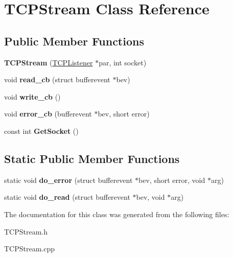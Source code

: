 \hypertarget{class_t_c_p_stream}{}\section{T\+C\+P\+Stream Class Reference}
\label{class_t_c_p_stream}
\subsection*{Public Member Functions}
\begin{DoxyCompactItemize}
\item 
\hypertarget{class_t_c_p_stream_ae126e2a8af6d194637373e76a1806b18}{}{\bfseries T\+C\+P\+Stream} (\hyperlink{class_t_c_p_listener}{T\+C\+P\+Listener} $\ast$par, int socket)\label{class_t_c_p_stream_ae126e2a8af6d194637373e76a1806b18}

\item 
\hypertarget{class_t_c_p_stream_a32945f003973524a10ea18bbaf14a075}{}void {\bfseries read\+\_\+cb} (struct bufferevent $\ast$bev)\label{class_t_c_p_stream_a32945f003973524a10ea18bbaf14a075}

\item 
\hypertarget{class_t_c_p_stream_a557fe31c23096914a4911fa3ebcb2f29}{}void {\bfseries write\+\_\+cb} ()\label{class_t_c_p_stream_a557fe31c23096914a4911fa3ebcb2f29}

\item 
\hypertarget{class_t_c_p_stream_a8dea29fae2a788badb0e478e332ac5a7}{}void {\bfseries error\+\_\+cb} (bufferevent $\ast$bev, short error)\label{class_t_c_p_stream_a8dea29fae2a788badb0e478e332ac5a7}

\item 
\hypertarget{class_t_c_p_stream_aaf98bda8c2e4e300dea89f8270ac8b25}{}const int {\bfseries Get\+Socket} ()\label{class_t_c_p_stream_aaf98bda8c2e4e300dea89f8270ac8b25}

\end{DoxyCompactItemize}
\subsection*{Static Public Member Functions}
\begin{DoxyCompactItemize}
\item 
\hypertarget{class_t_c_p_stream_a862545460538d4cb7d61e4e7c9b9a41c}{}static void {\bfseries do\+\_\+error} (struct bufferevent $\ast$bev, short error, void $\ast$arg)\label{class_t_c_p_stream_a862545460538d4cb7d61e4e7c9b9a41c}

\item 
\hypertarget{class_t_c_p_stream_a15157ed97d88908007c5d26cdd8da4b6}{}static void {\bfseries do\+\_\+read} (struct bufferevent $\ast$bev, void $\ast$arg)\label{class_t_c_p_stream_a15157ed97d88908007c5d26cdd8da4b6}

\end{DoxyCompactItemize}


The documentation for this class was generated from the following files\+:\begin{DoxyCompactItemize}
\item 
T\+C\+P\+Stream.\+h\item 
T\+C\+P\+Stream.\+cpp\end{DoxyCompactItemize}
